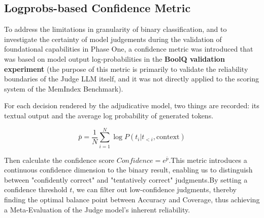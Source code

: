 \subsection{Logprobs-based Confidence Metric}

To address the limitations in granularity of binary classification, and to investigate the certainty of model judgements during the validation of foundational capabilities in Phase One, a confidence metric was introduced that was based on model output log-probabilities in the \textbf{BoolQ validation experiment} (the purpose of this metric is primarily to validate the reliability boundaries of the Judge LLM itself, and it was not directly applied to the scoring system of the MemIndex Benchmark).

For each decision rendered by the adjudicative model, two things are recorded: its textual output and the average log probability of generated tokens.

$$
\bar{p} = \frac{1}{N} \sum_{i=1}^{N} \log P(t_i | t_{<i}, \text{context})
$$

Then calculate the confidence score $Confidence = e^{\bar{p}}$.This metric introduces a continuous confidence dimension to the binary result, enabling us to distinguish between "confidently correct" and "tentatively correct" judgments.By setting a confidence threshold $t$, we can filter out low-confidence judgments, thereby finding the optimal balance point between Accuracy and Coverage, thus achieving a Meta-Evaluation of the Judge model's inherent reliability.

